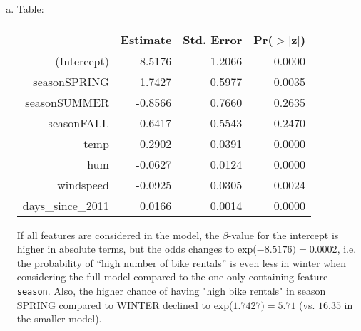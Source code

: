 {\begin{enumerate}[a)]
	The intercept gives the odds for ``high number of bike rentals'' vs. ``low to medium number of bike rentals'' in winter: exp$(-3.2131) = 0.04$. Interpretation as in a).
	
	Regarding the estimate of seasonSPRING: $\text{odds ratio (when season changes from winter to spring)} = \text{exp}(2.7941) =  16.35$. Interpretation as in b).
	\item Table:
	
	\begin{table}[ht]
		\centering
		\begin{tabular}{rrrr}
			\hline
			& Estimate & Std. Error & Pr($>$$|$z$|$) \\ 
			\hline
			(Intercept) & -8.5176 & 1.2066 & 0.0000 \\ 
			seasonSPRING & 1.7427 & 0.5977 & 0.0035 \\ 
			seasonSUMMER & -0.8566 & 0.7660 & 0.2635 \\ 
			seasonFALL & -0.6417 & 0.5543 & 0.2470 \\ 
			temp & 0.2902 & 0.0391 & 0.0000 \\ 
			hum & -0.0627 & 0.0124 & 0.0000 \\ 
			windspeed & -0.0925 & 0.0305 & 0.0024 \\ 
			days\_since\_2011 & 0.0166 & 0.0014 & 0.0000 \\ 
			\hline
		\end{tabular}
	\end{table}
	
	If all features are considered in the model, the $\beta$-value for the intercept is higher in absolute terms, but the odds changes to exp($-8.5176) = 0.0002$, i.e. the probability of ``high number of bike rentals'' is even less in winter when considering the full model compared to the one only containing feature \texttt{season}. Also, the higher chance of having "high bike rentals" in season SPRING compared to WINTER declined to exp($1.7427)=5.71$ (vs. $16.35$ in the smaller model).
\end{enumerate}
}
